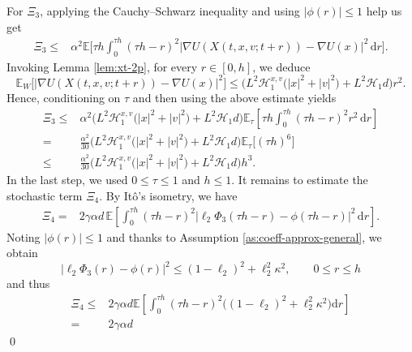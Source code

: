 \documentclass[12pt]{article}
\numberwithin{equation}{section}
\renewenvironment{proof}%
  {\begin{trivlist}%
   \item[]\ignorespaces}%
  {\qed\end{trivlist}}
\newcommand{\dd}{\mathrm{d}}
\begin{document}
\begin{proof}
For \(\Xi_3\), applying the Cauchy--Schwarz inequality and using \(|\phi(r)|\leq1\) help us get
\begin{equation}
\label{eq:Xi3-cauchy}
\begin{aligned}
\Xi_3
\leq&
\alpha^2
\mathbb E
\Bigg[
\tau h
\int_0^{\tau h}
(\tau h-r)^2
\big|
\nabla U(X(t,x,v;t+r))-\nabla U(x)
\big|^2
\,\dd r
\Bigg].
\end{aligned}
\end{equation}
Invoking Lemma \ref{lem:xt-2p}, for every \(r\in[0, h]\), we deduce
\[
\mathbb E_{W}
\Big[
\big|
\nabla U(X(t,x,v;t+r))-\nabla U(x)
\big|^2
\Big]
\leq
\Big(
L^2\mathscr H^{x,v}_1
\big(
|x|^2+|v|^2
\big)
+
L^2\mathscr H_1d
\Big)r^2.
\]
Hence, conditioning on \(\tau\) and then using the above estimate yields
\begin{equation}
\label{eq:Xi3-estimate}
\begin{aligned}
\Xi_3
\leq&
\alpha^2
\Big(
L^2\mathscr H^{x,v}_1
\big(
|x|^2+|v|^2
\big)
+
L^2\mathscr H_1d
\Big)
\mathbb E_\tau
\left[
\tau h
\int_0^{\tau h}
(\tau h-r)^2 r^2\,\dd r
\right]
\\
=&
\tfrac{\alpha^2}{30}
\Big(
L^2\mathscr H^{x,v}_1
\big(
|x|^2+|v|^2
\big)
+
L^2\mathscr H_1d
\Big)
\mathbb E_\tau
\big[
(\tau h)^6
\big]
\\
\leq&
\tfrac{\alpha^2}{30}
\Big(
L^2\mathscr H^{x,v}_1
\big(
|x|^2+|v|^2
\big)
+
L^2\mathscr H_1d
\Big)
h^3.
\end{aligned}
\end{equation}
In the last step, we used \(0\leq\tau\leq1\) and \(h\leq1\).
It remains to estimate the stochastic term \(\Xi_4\). 
By It\^o's isometry, we have
\begin{equation}
\label{eq:Xi4-ito}
\begin{aligned}
\Xi_4
=&
2\gamma\alpha d\,
\mathbb E
\left[
\int_0^{\tau h}
(\tau h-r)^2
\big|
\ell_2\Phi_3(\tau h-r)-\phi(\tau h-r)
\big|^2
\,\dd r
\right].
\end{aligned}
\end{equation}
Noting \(|\phi(r)|\leq1\) and thanks to Assumption \ref{as:coeff-approx-general}, we obtain
\[
\big|
\ell_2\Phi_3(r)-\phi(r)
\big|^2
\leq
(1-\ell_2)^2
+
\ell_2^2\kappa^2,
\qquad
0\leq r\leq  h
\]
and thus
\begin{equation}
\label{eq:Xi4-estimate}
\begin{aligned}
\Xi_4
\leq&
2\gamma\alpha d
\mathbb E
\left[
\int_0^{\tau h}
(\tau h-r)^2
\Big(
(1-\ell_2)^2
+
\ell_2^2\kappa^2
\Big)\dd r
\right]
\\
=&
2\gamma\alpha d

\end{aligned}
\end{equation}
\end{proof}
\end{document}
